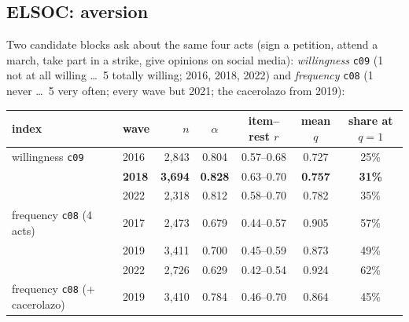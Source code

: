 \documentclass[11pt,a4paper]{article}
\newcommand{\code}[1]{\texttt{#1}}
\begin{document}
\subsection{ELSOC: aversion}
\label{sec:pr5q}

Two candidate blocks ask about the same four acts (sign a petition, attend a march, take part in a
strike, give opinions on social media): \emph{willingness} \code{c09} (1 not at all willing \dots\ 5
totally willing; 2016, 2018, 2022) and \emph{frequency} \code{c08} (1 never \dots\ 5 very often; every
wave but 2021; the cacerolazo from 2019):

\begin{center}
\small
\begin{tabular}{@{}llrcccc@{}}
\toprule
index & wave & $n$ & $\alpha$ & item--rest $r$ & mean $q$ & share at $q = 1$ \\
\midrule
willingness \code{c09} & 2016 & 2{,}843 & 0.804 & 0.57--0.68 & 0.727 & 25\% \\
 & \textbf{2018} & \textbf{3{,}694} & \textbf{0.828} & 0.63--0.70 & \textbf{0.757} & \textbf{31\%} \\
 & 2022 & 2{,}318 & 0.812 & 0.58--0.70 & 0.782 & 35\% \\
frequency \code{c08} (4 acts) & 2017 & 2{,}473 & 0.679 & 0.44--0.57 & 0.905 & 57\% \\
 & 2019 & 3{,}411 & 0.700 & 0.45--0.59 & 0.873 & 49\% \\
 & 2022 & 2{,}726 & 0.629 & 0.42--0.54 & 0.924 & 62\% \\
frequency \code{c08} (+ cacerolazo) & 2019 & 3{,}410 & 0.784 & 0.46--0.70 & 0.864 & 45\% \\
\bottomrule
\end{tabular}
\end{center}
\end{document}
